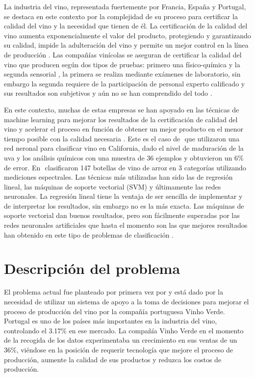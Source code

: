 \documentclass[runningheads]{llncs}
\begin{document}
La industria del vino, representada fuertemente por Francia, Espa\~{n}a y Portugal, se destaca en este contexto por la complejidad de su proceso para certificar la calidad del vino y la necesidad que tienen de {\'e}l. La certificaci{\'o}n de la calidad del vino aumenta exponencialmente el valor del producto, protegiendo y garantizando su calidad, impide la adulteraci{\'o}n del vino y permite un mejor control en la l{\'i}nea de producci{\'o}n \cite{er2016classification}⁠. Las compa\~{n}{\'i}as vin{\'i}colas se aseguran de certificar la calidad del vino que producen seg{\'u}n dos tipos de pruebas: primero una f{\'i}sico-qu{\'i}mica y la segunda sensorial \cite{radosavljevicdata}⁠, la primera se realiza mediante ex{\'a}menes de laboratorio, sin embargo la segunda requiere de la participaci{\'o}n de personal experto calificado y sus resultados son subjetivos y a{\'u}n no se han comprendido del todo \cite{ye2020new}⁠.

En este contexto, muchas de estas empresas se han apoyado en las t{\'e}cnicas de machine learning para mejorar los resultados de la certificaci{\'o}n de calidad del vino y acelerar el proceso en funci{\'o}n de obtener un mejor producto en el menor tiempo posible con la calidad necesaria \cite{ramazanrole}⁠. Este es el caso de \cite{vlassides2001using}⁠ que utilizaron una red neronal para clasificar vino en California, dado el nivel de maduraci{\'o}n de la uva y los an{\'a}lisis qu{\'i}micos con una muestra de 36 ejemplos y obtuvieron un 6\% de error. En \cite{yu2008prediction}⁠ clasificaron 147 botellas de vino de arroz en 3 categor{\'i}as utilizando mediciones espectrales. Las t{\'e}cnicas m{\'a}s utilizadas han sido las de regresi{\'o}n lineal, las m{\'a}quinas de soporte vectorial (SVM) y {\'u}ltimamente las redes neuronales. La regresi{\'o}n lineal tiene la ventaja de ser sencilla de implementar y de interpretar los resultados, sin embargo no es la m{\'a}s exacta. Las m{\'a}quinas de soporte vectorial dan buenos resultados, pero son f{\'a}cilmente superadas por las redes neuronales artificiales que hasta el momento son las que mejores resultados han obtenido en este tipo de problemas de clasificaci{\'o}n \cite{er2016classification}⁠. 

\section{Descripci{\'o}n del problema}
El problema actual fue planteado por primera vez por \cite{cortez2009modeling} ⁠y est{\'a} dado por la necesidad de utilizar un sistema de apoyo a la toma de decisiones para mejorar el proceso de producci{\'o}n del vino por la compa\~{n}{\'i}a portuguesa Vinho Verde. Portugal es uno de los pa{\'i}ses m{\'a}s importantes en la industria del vino, controlando el 3.17\% en ese mercado. La compa\~{n}{\'i}a Vinho Verde en el momento de la recogida de los datos experimentaba un crecimiento en sus ventas de un 36\%, vi{\'e}ndose en la posici{\'o}n de requerir tecnolog{\'i}a que mejore el proceso de producci{\'o}n, aumente la calidad de sus productos y reduzca los costos de producci{\'o}n.
\end{document}

